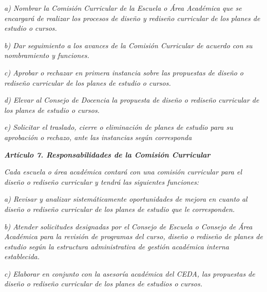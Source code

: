 \textit{a) Nombrar la Comisión Curricular de la Escuela o Área Académica que se}\textit{ }\textit{encargará de realizar los procesos de diseño y rediseño curricular de los}\textit{ }\textit{planes de estudio o cursos.}\par

\textit{b) Dar seguimiento a los avances de la Comisión Curricular de acuerdo con}\textit{ }\textit{su nombramiento y funciones.}\par

\textit{c) Aprobar o rechazar en primera instancia sobre las propuestas de diseño}\textit{ }\textit{o rediseño curricular de los planes de estudio o cursos.}\par

\textit{d) Elevar}\textit{ }\textit{al Consejo de Docencia la propuesta de diseño o rediseño}\textit{ }\textit{curricular de los planes de estudio o cursos.}\par

\textit{e) Solicitar el traslado, cierre o eliminación de planes de estudio para su}\textit{ }\textit{aprobación o rechazo, ante las instancias según corresponda}\par

\textit{\textbf{Artículo 7. Responsabilidades de la Comisión Curricular}}\par

\textit{Cada escuela o área académica contará con una comisión curricular para el}\textit{ }\textit{diseño o rediseño curricular y tendrá las siguientes funciones:}\textit{ }\par

\textit{a) Revisar y analizar sistemáticamente oportunidades de mejora en cuanto}\textit{ }\textit{al diseño o rediseño curricular de los planes de estudio que le}\textit{ }\textit{corresponden.}\par

\textit{b) Atender solicitudes designadas por el Consejo de Escuela o Consejo de}\textit{ }\textit{Área Académica para la revisión de programas del curso, diseño o}\textit{ }\textit{rediseño de planes de estudio según la estructura administrativa de}\textit{ }\textit{gestión académica interna establecida.}\par

\textit{c) Elaborar en conjunto con la asesoría académica del CEDA, las}\textit{ }\textit{propuestas de diseño o rediseño curricular de los planes de estudios o}\textit{ }\textit{cursos.}\par

